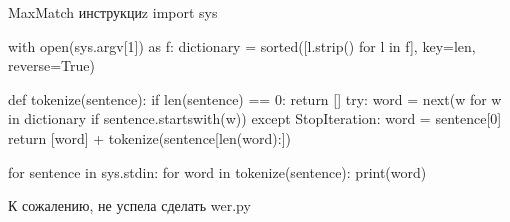     MaxMatch инструкциz	
     import sys

with open(sys.argv[1]) as f:
  dictionary = sorted([l.strip() for l in f], key=len, reverse=True)

def tokenize(sentence):
  if len(sentence) == 0:
    return []
  try:
    word = next(w for w in dictionary if sentence.startswith(w))
  except StopIteration:
    word = sentence[0]
  return [word] + tokenize(sentence[len(word):])

for sentence in sys.stdin:
  for word in tokenize(sentence):
    print(word)
	
	
	
	К сожалению, не успела сделать wer.py